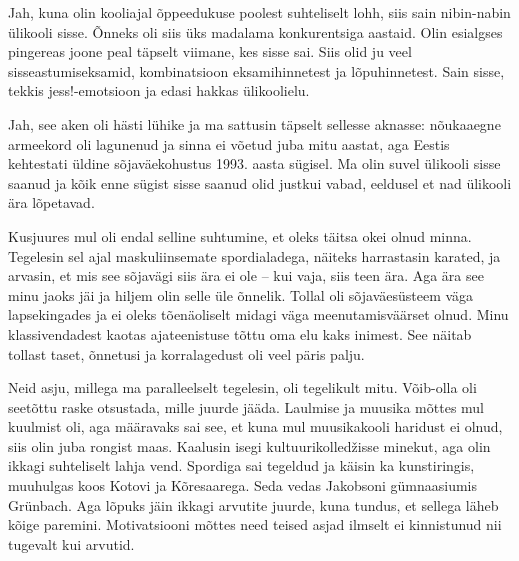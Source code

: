 
Jah, kuna olin kooliajal õppeedukuse
poolest suhteliselt lohh, siis sain nibin-nabin ülikooli sisse. 
Õnneks oli siis üks madalama konkurentsiga aastaid. Olin esialgses pingereas joone peal täpselt viimane, kes sisse sai. 
Siis olid ju veel sisseastumiseksamid, kombinatsioon 
eksamihinnetest ja lõpuhinnetest. Sain sisse, tekkis jess!-emotsioon ja edasi hakkas ülikoolielu. 


Jah, see aken oli hästi lühike ja ma sattusin täpselt sellesse aknasse: 
nõukaaegne armeekord oli 
lagunenud ja sinna ei võetud juba mitu aastat, aga Eestis kehtestati üldine 
sõjaväekohustus 1993. aasta sügisel. Ma olin suvel ülikooli sisse 
saanud ja kõik enne sügist sisse saanud olid justkui vabad, eeldusel et nad ülikooli ära lõpetavad. 


Kusjuures mul oli endal selline suhtumine, et 
oleks täitsa okei olnud minna. Tegelesin sel ajal maskuliinsemate spordialadega, näiteks harrastasin karated, ja 
arvasin, et mis see sõjavägi siis ära ei ole -- kui vaja, siis 
teen ära. Aga ära see minu jaoks jäi ja hiljem olin selle üle õnnelik. 
Tollal oli sõjaväesüsteem 
väga lapsekingades ja ei oleks tõenäoliselt midagi 
väga meenutamisväärset olnud. Minu 
klassivendadest kaotas ajateenistuse tõttu oma elu kaks inimest. See 
näitab tollast taset, õnnetusi ja korralagedust oli veel päris palju. 


Neid asju, millega ma paralleelselt tegelesin, oli tegelikult mitu. Võib-olla oli seetõttu raske otsustada, mille juurde jääda. 
Laulmise ja muusika mõttes mul kuulmist oli, aga määravaks sai see, et 
kuna mul muusikakooli haridust ei olnud, siis olin juba 
rongist maas. Kaalusin isegi 
kultuurikolledžisse minekut, aga olin ikkagi suhteliselt lahja 
vend. Spordiga sai tegeldud ja käisin ka kunstiringis, muuhulgas koos 
Kotovi ja Kõresaarega. Seda vedas Jakobsoni gümnaasiumis Grünbach. Aga
lõpuks jäin ikkagi arvutite juurde, kuna tundus, et sellega läheb kõige paremini. Motivatsiooni mõttes need teised asjad 
ilmselt ei kinnistunud nii tugevalt kui arvutid. 

